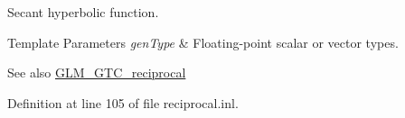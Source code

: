 Secant hyperbolic function.


\begin{DoxyTemplParams}{Template Parameters}
{\em gen\+Type} & Floating-\/point scalar or vector types.\\
\hline
\end{DoxyTemplParams}
\begin{DoxySeeAlso}{See also}
\mbox{\hyperlink{group__gtc__reciprocal}{G\+L\+M\+\_\+\+G\+T\+C\+\_\+reciprocal}} 
\end{DoxySeeAlso}


Definition at line 105 of file reciprocal.\+inl.

